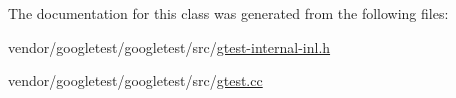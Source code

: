 The documentation for this class was generated from the following files\+:\begin{DoxyCompactItemize}
\item 
vendor/googletest/googletest/src/\hyperlink{gtest-internal-inl_8h}{gtest-\/internal-\/inl.\+h}\item 
vendor/googletest/googletest/src/\hyperlink{gtest_8cc}{gtest.\+cc}\end{DoxyCompactItemize}

